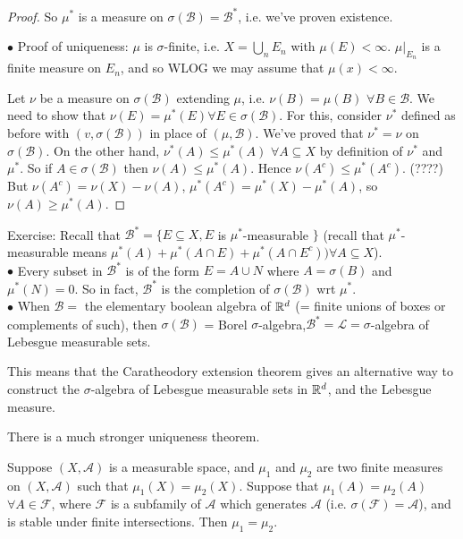 \documentclass[a4paper]{article}
\begin{document}
\begin{thm}
\begin{proof}
So $\mu^*$ is a measure on $\sigma(\mathcal{B})=\mathcal{B}^*$, i.e. we've proven existence.

$\bullet$ Proof of uniqueness: $\mu$ is $\sigma$-finite, i.e. $X=\bigcup_n E_n$ with $\mu(E) < \infty$. $\mu|_{E_n}$ is a finite measure on $E_n$, and so WLOG we may assume that $\mu(x) < \infty$.

Let $\nu$ be a measure on $\sigma(\mathcal{B})$ extending $\mu$, i.e. $\nu(B) = \mu(B)$ $\forall B \in \mathcal{B}$. We need to show that $\nu(E) = \mu^*(E) \forall E \in \sigma(\mathcal{B})$. For this, consider $\nu^*$ defined as before with $(v,\sigma(\mathcal{B}))$ in place of $(\mu,\mathcal{B})$. We've proved that $\nu^* = \nu$ on $\sigma(\mathcal{B})$. On the other hand, $\nu^*(A) \leq \mu^*(A)$ $\forall A \subseteq X$ by definition of $\nu^*$ and $\mu^*$. So if $A \in \sigma(\mathcal{B})$ then $\nu(A) \leq \mu^*(A)$. Hence $\nu(A^c) \leq \mu^*(A^c)$. (????) But $\nu(A^c) = \nu(X) - \nu(A)$, $\mu^*(A^c) = \mu^*(X) -\mu^*(A)$, so $\nu(A) \geq \mu^*(A)$.

\end{proof}
\end{thm}

Exercise: Recall that $\mathcal{B}^* = \{E \subseteq X, E$ is $\mu^*$-measurable $\}$ (recall that $\mu^*$-measurable means $\mu^*(A)+\mu^*(A \cap E) + \mu^*(A \cap E^c)) \forall A \subseteq X$).\\
$\bullet$ Every subset in $\mathcal{B}^*$ is of the form $E = A \cup N$ where $A = \sigma(B)$ and $\mu^*(N)=0$. So in fact, $\mathcal{B}^*$ is the completion of $\sigma(\mathcal{B})$ wrt $\mu^*$.\\
$\bullet$ When $\mathcal{B}=$ the elementary boolean algebra of $\mathbb{R}^d$ (= finite unions of boxes or complements of such), then $\sigma(\mathcal{B})$ = Borel $\sigma$-algebra,$\mathcal{B}^* = \mathcal{L}=\sigma$-algebra of Lebesgue measurable sets.

\begin{rem}
This means that the Caratheodory extension theorem gives an alternative way to construct the $\sigma$-algebra of Lebesgue measurable sets in $\mathbb{R}^d$, and the Lebesgue measure.
\end{rem}

There is a much stronger uniqueness theorem.

\begin{thm}
Suppose $(X,\mathcal{A})$ is a measurable space, and $\mu_1$ and $\mu_2$ are two finite measures on $(X,\mathcal{A})$ such that $\mu_1(X) = \mu_2(X)$. Suppose that $\mu_1(A) = \mu_2(A)$ $\forall A \in \mathcal{F}$, where $\mathcal{F}$ is a subfamily of $\mathcal{A}$ which generates $\mathcal{A}$ (i.e. $\sigma(\mathcal{F}) = \mathcal{A}$), and is stable under finite intersections. Then $\mu_1 = \mu_2$.
\end{thm}
\end{document}
